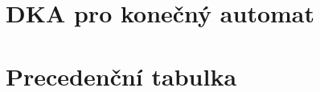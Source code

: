 \documentclass[a4paper, 11pt]{article}
\begin{document}
	\section*{DKA pro konečný automat}
	\endgroup
	\vspace{1.8cm}
	\begin{figure}[h]
		\centering
		\hspace*{-1.2cm}
		\label{DKA}
	\end{figure}
	\newpage

	\begingroup\centering
	\section*{Precedenční tabulka}
	\endgroup
	\vspace{1.8cm}
	\begin{figure}[h]
		\centering
		\hspace*{-2cm}
		\label{prec_table}
	\end{figure}
	\newpage
	
	\begingroup\centering
\end{document}
